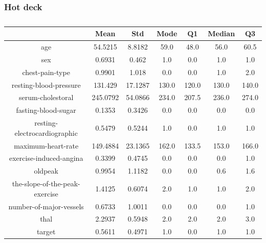 \documentclass{classrep}
\begin{document}
{{{            }

            \subsubsection{Hot deck}
            \label{results:5-percent:dot-deck} {
                \begin{table}[!htbp]
                    \centering
                    \begin{tabular}{|c|c|c|c|c|c|c|}
                        \hline
                        & Mean & Std & Mode & Q1 & Median & Q3 \\ \hline
                        age & 54.5215 & 8.8182 & 59.0 & 48.0 & 56.0 & 60.5 \\ \hline
                        sex & 0.6931 & 0.462 & 1.0 & 0.0 & 1.0 & 1.0 \\ \hline
                        chest-pain-type & 0.9901 & 1.018 & 0.0 & 0.0 & 1.0 & 2.0 \\ \hline
                        resting-blood-pressure & 131.429 & 17.1287 & 130.0 & 120.0 & 130.0 & 140.0 \\ \hline
                        serum-cholestoral & 245.0792 & 54.0866 & 234.0 & 207.5 & 236.0 & 274.0 \\ \hline
                        fasting-blood-sugar & 0.1353 & 0.3426 & 0.0 & 0.0 & 0.0 & 0.0 \\ \hline
                        resting-electrocardiographic & 0.5479 & 0.5244 & 1.0 & 0.0 & 1.0 & 1.0 \\ \hline
                        maximum-heart-rate & 149.4884 & 23.1365 & 162.0 & 133.5 & 153.0 & 166.0 \\ \hline
                        exercise-induced-angina & 0.3399 & 0.4745 & 0.0 & 0.0 & 0.0 & 1.0 \\ \hline
                        oldpeak & 0.9954 & 1.1182 & 0.0 & 0.0 & 0.6 & 1.6 \\ \hline
                        the-slope-of-the-peak-exercise & 1.4125 & 0.6074 & 2.0 & 1.0 & 1.0 & 2.0 \\ \hline
                        number-of-major-vessels & 0.6733 & 1.0011 & 0.0 & 0.0 & 0.0 & 1.0 \\ \hline
                        thal & 2.2937 & 0.5948 & 2.0 & 2.0 & 2.0 & 3.0 \\ \hline
                        target & 0.5611 & 0.4971 & 1.0 & 0.0 & 1.0 & 1.0 \\ \hline
                    \end{tabular}
                    \caption{}
                    \label{result_5_Hot-deck}
                \end{table}
                \FloatBarrier

}}}
\end{document}
